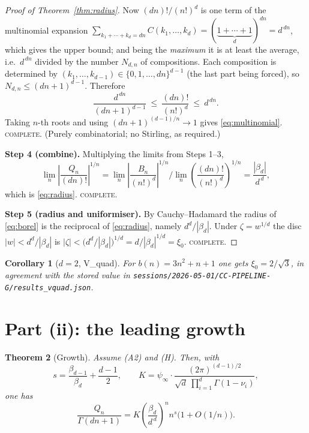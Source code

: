 \documentclass[11pt]{article}
\newtheorem{theorem}{Theorem}
\newtheorem{corollary}[theorem]{Corollary}
\theoremstyle{definition}
\newcommand{\bd}{\beta_d}
\newcommand{\bdm}{\beta_{d-1}}
\newcommand{\psiinf}{\psi_\infty}
\begin{document}
\begin{proof}[Proof of Theorem~\ref{thm:radius}]
Now $(dn)!/(n!)^d$ is one term of the multinomial expansion
$\sum_{k_1+\cdots+k_d=dn}C(k_1,\dots,k_d)=(\underbrace{1+\cdots+1}_{d})^{dn}=d^{\,dn}$,
which gives the upper bound; and being the \emph{maximum} it is at least the
average, i.e.\ $d^{\,dn}$ divided by the number $N_{d,n}$ of compositions. Each
composition is determined by $(k_1,\dots,k_{d-1})\in\{0,1,\dots,dn\}^{d-1}$
(the last part being forced), so $N_{d,n}\le(dn+1)^{d-1}$. Therefore
\[
\frac{d^{\,dn}}{(dn+1)^{d-1}}\ \le\ \frac{(dn)!}{(n!)^d}\ \le\ d^{\,dn}.
\]
Taking $n$-th roots and using $(dn+1)^{(d-1)/n}\to1$ gives
\eqref{eq:multinomial}. \textsc{complete.} (Purely combinatorial; no Stirling,
as required.)

\medskip\noindent\textbf{Step 4 (combine).}
Multiplying the limits from Steps 1--3,
\[
\lim_n\left|\frac{Q_n}{(dn)!}\right|^{1/n}
=\lim_n\left|\frac{B_n}{(n!)^{d}}\right|^{1/n}
\Big/\lim_n\left(\frac{(dn)!}{(n!)^{d}}\right)^{1/n}
=\frac{|\bd|}{d^{\,d}},
\]
which is \eqref{eq:radius}. \textsc{complete.}

\medskip\noindent\textbf{Step 5 (radius and uniformiser).}
By Cauchy--Hadamard the radius of \eqref{eq:borel} is the reciprocal of
\eqref{eq:radius}, namely $d^d/|\bd|$. Under $\zeta=w^{1/d}$ the disc
$|w|<d^d/|\bd|$ is $|\zeta|<\bigl(d^d/|\bd|\bigr)^{1/d}=d/|\bd|^{1/d}=\xi_0$.
\textsc{complete.}
\end{proof}

\begin{corollary}[$d=2$, V\_quad]\label{cor:vquad}
For $b(n)=3n^2+n+1$ one gets $\xi_0=2/\sqrt3$, in agreement with the stored
value in \texttt{sessions/2026-05-01/CC-PIPELINE-G/results\_vquad.json}.
\end{corollary}

\section{Part (ii): the leading growth}

\begin{theorem}[Growth]\label{thm:growth}
Assume \textup{(A2)} and \textup{(H)}. Then, with
\begin{equation}\label{eq:sK}
s=\frac{\bdm}{\bd}+\frac{d-1}{2},
\qquad
K=\psiinf\cdot\frac{(2\pi)^{(d-1)/2}}{\sqrt{d}\ \prod_{i=1}^{d}\Gamma(1-\nu_i)},
\end{equation}
one has
\begin{equation}\label{eq:growth}
\frac{Q_n}{\Gamma(dn+1)}
=K\left(\frac{\bd}{d^{\,d}}\right)^{\!n} n^{s}\bigl(1+O(1/n)\bigr).
\end{equation}
\end{theorem}
\end{document}
